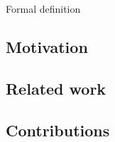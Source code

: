 \begin{frame}{Formal definition}

\end{frame}

\subsection{Motivation}


\subsection{Related work}


\subsection{Contributions}

